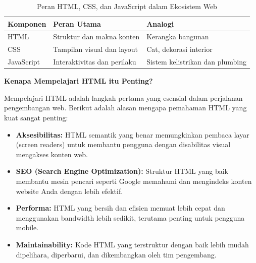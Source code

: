 \begin{table}[H]
\centering
\begin{tabular}{|P{3cm}|P{4cm}|P{5cm}|}
\hline
\textbf{Komponen} & \textbf{Peran Utama} & \textbf{Analogi} \\
\hline
HTML & Struktur dan makna konten & Kerangka bangunan \\
\hline
CSS & Tampilan visual dan layout & Cat, dekorasi interior \\
\hline
JavaScript & Interaktivitas dan perilaku & Sistem kelistrikan dan plumbing \\
\hline
\end{tabular}
\caption{Peran HTML, CSS, dan JavaScript dalam Ekosistem Web}
\label{tab:web-triad}
\end{table}

\begin{konsep}
\textbf{Kenapa Mempelajari HTML itu Penting?}

Mempelajari HTML adalah langkah pertama yang esensial dalam perjalanan pengembangan web. Berikut adalah alasan mengapa pemahaman HTML yang kuat sangat penting:

\begin{itemize}[leftmargin=*]
  \item \textbf{Aksesibilitas:} HTML semantik yang benar memungkinkan pembaca layar (screen readers) untuk membantu pengguna dengan disabilitas visual mengakses konten web.
  \item \textbf{SEO (Search Engine Optimization):} Struktur HTML yang baik membantu mesin pencari seperti Google memahami dan mengindeks konten website Anda dengan lebih efektif.
  \item \textbf{Performa:} HTML yang bersih dan efisien memuat lebih cepat dan menggunakan bandwidth lebih sedikit, terutama penting untuk pengguna mobile.
  \item \textbf{Maintainability:} Kode HTML yang terstruktur dengan baik lebih mudah dipelihara, diperbarui, dan dikembangkan oleh tim pengembang.
\end{itemize}
\end{konsep}

